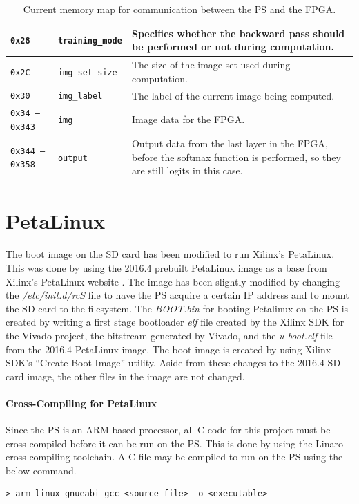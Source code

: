 \begin{table}
\begin{tabularx}{\textwidth}{|l| l| X|}
		\texttt{0x28} &
		\texttt{training\_mode} &
		Specifies whether the backward pass should be performed or not during computation.\\\hline
		
		\texttt{0x2C} &
		\texttt{img\_set\_size} &
		The size of the image set used during computation. \\\hline 
		
		\texttt{0x30} &
		\texttt{img\_label} &
		The label of the current image being computed. \\\hline 
		
		\texttt{0x34 -- 0x343} &
		\texttt{img} &
		Image data for the FPGA. \\\hline
		
		\texttt{0x344 -- 0x358} &
		\texttt{output} &
		Output data from the last layer in the FPGA, before the softmax function is performed, so they are still logits in this case.\\\hline		
	\end{tabularx}	
	\caption{Current memory map for communication between the PS and the FPGA.}
	\label{tbl:mmio}
\end{table}

\section{PetaLinux}
The boot image on the SD card has been modified to run Xilinx's PetaLinux. This was done by using the 2016.4 prebuilt PetaLinux image as a base from Xilinx's PetaLinux website \cite{petalinux}. The image has been slightly modified by changing the \textit{/etc/init.d/rcS} file to have the PS acquire a certain IP address and to mount the SD card to the filesystem. The \textit{BOOT.bin} for booting Petalinux on the PS is created by writing a first stage bootloader \textit{elf} file created by the Xilinx SDK for the Vivado project, the bitstream generated by Vivado, and the \textit{u-boot.elf} file from the 2016.4 PetaLinux image. The boot image is created by using Xilinx SDK's ``Create Boot Image'' utility. Aside from these changes to the 2016.4 SD card image, the other files in the image are not changed.

\paragraph{Cross-Compiling for PetaLinux}
Since the PS is an ARM-based processor, all C code for this project must be cross-compiled before it can be run on the PS. This is done by using the Linaro cross-compiling toolchain. A C file may be compiled to run on the PS using the below command.
\begin{lstlisting}
> arm-linux-gnueabi-gcc <source_file> -o <executable>
\end{lstlisting}

